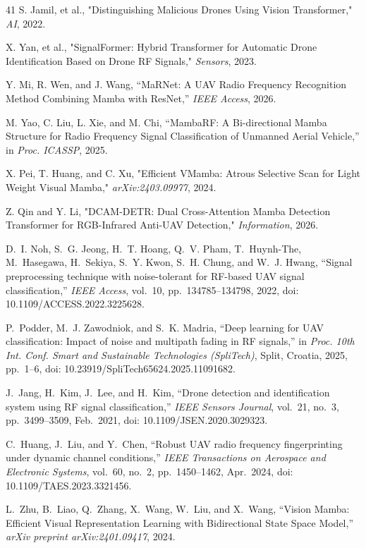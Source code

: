 \documentclass[runningheads]{llncs}
\begin{document}
\begin{thebibliography}{41}
S. Jamil, et al., "Distinguishing Malicious Drones Using Vision Transformer," \emph{AI}, 2022.

X. Yan, et al., "SignalFormer: Hybrid Transformer for Automatic Drone Identification Based on Drone RF Signals," \emph{Sensors}, 2023.

Y. Mi, R. Wen, and J. Wang, 
``MaRNet: A UAV Radio Frequency Recognition Method Combining Mamba with ResNet,'' 
\emph{IEEE Access}, 2026.

M. Yao, C. Liu, L. Xie, and M. Chi, 
``MambaRF: A Bi-directional Mamba Structure for Radio Frequency Signal Classification of Unmanned Aerial Vehicle,'' 
in \emph{Proc. ICASSP}, 2025.

X. Pei, T. Huang, and C. Xu, "Efficient VMamba: Atrous Selective Scan for Light Weight Visual Mamba," \emph{arXiv:2403.09977}, 2024.

Z. Qin and Y. Li, "DCAM-DETR: Dual Cross-Attention Mamba Detection Transformer for RGB-Infrared Anti-UAV Detection," \emph{Information}, 2026.


D.~I. Noh, S.~G. Jeong, H.~T. Hoang, Q.~V. Pham, T.~Huynh-The, 
M.~Hasegawa, H.~Sekiya, S.~Y. Kwon, S.~H. Chung, and W.~J. Hwang,
``Signal preprocessing technique with noise-tolerant for RF-based UAV signal classification,''
\emph{IEEE Access}, vol.~10, pp.~134785--134798, 2022,
doi: 10.1109/ACCESS.2022.3225628.

P.~Podder, M.~J. Zawodniok, and S.~K. Madria,
``Deep learning for UAV classification: Impact of noise and multipath fading in RF signals,''
in \emph{Proc. 10th Int. Conf. Smart and Sustainable Technologies (SpliTech)}, 
Split, Croatia, 2025, pp.~1--6,
doi: 10.23919/SpliTech65624.2025.11091682.

J.~Jang, H.~Kim, J.~Lee, and H.~Kim,
``Drone detection and identification system using RF signal classification,''
\emph{IEEE Sensors Journal}, vol.~21, no.~3, pp.~3499--3509, Feb.~2021,
doi: 10.1109/JSEN.2020.3029323.

C.~Huang, J.~Liu, and Y.~Chen,
``Robust UAV radio frequency fingerprinting under dynamic channel conditions,''
\emph{IEEE Transactions on Aerospace and Electronic Systems}, 
vol.~60, no.~2, pp.~1450--1462, Apr.~2024,
doi: 10.1109/TAES.2023.3321456.

L.~Zhu, B.~Liao, Q.~Zhang, X.~Wang, W.~Liu, and X.~Wang,
``Vision Mamba: Efficient Visual Representation Learning with Bidirectional State Space Model,''
\emph{arXiv preprint arXiv:2401.09417}, 2024.


\end{thebibliography}
\end{document}
